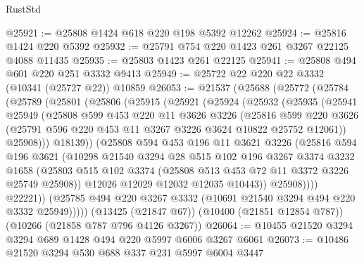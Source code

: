 \begin{lexlean}{RustStd}
\begin{coremodule}
{\begin{coremodule}
{{{{{{{{{{{{{{{{{{{{{{{{{@25921 := @25808 @1424 @618 @220 @198 @5392 @12262
@25924 := @25816 @1424 @220 @5392
@25932 := @25791 @754 @220 @1423 @261 @3267 @22125 @4088 @11435
@25935 := @25803 @1423 @261 @22125
@25941 := @25808 @494 @601 @220 @251 @3332 @9413
@25949 := @25722 @22 @220 @22 @3332 (@10341 (@25727 @22)) @10859
@26053 := @21537
    (@25688
      (@25772
        (@25784
          (@25789
            (@25801
              (@25806
                (@25915
                  (@25921
                    (@25924
                      (@25932
                        (@25935
                          (@25941
                            @25949
                            (@25808
                              @599
                              @453
                              @220
                              @11
                              @3626
                              @3226
                              (@25816
                                @599
                                @220
                                @3626
                                (@25791 @596 @220 @453 @11 @3267 @3226 @3624 @10822 @25752 @12061))
                              @25908)))
                        @18139))
                    (@25808
                      @594
                      @453
                      @196
                      @11
                      @3621
                      @3226
                      (@25816
                        @594
                        @196
                        @3621
                        (@10298
                          @21540
                          @3294
                          @28
                          @515
                          @102
                          @196
                          @3267
                          @3374
                          @3232
                          @1658
                          (@25803
                            @515
                            @102
                            @3374
                            (@25808 @513 @453 @72 @11 @3372 @3226 @25749 @25908))
                          @12026
                          @12029
                          @12032
                          @12035
                          @10443))
                      @25908))))
              @22221))
          (@25785 @494 @220 @3267 @3332 (@10691 @21540 @3294 @494 @220 @3332 @25949)))))
    (@13425 (@21847 @67))
    (@10400 (@21851 @12854 @787))
    (@10266 (@21858 @787 @796 @4126 @3267))
@26064 := @10455 @21520 @3294 @3294 @689 @1428 @494 @220 @5997 @6006 @3267 @6061
@26073 := @10486 @21520 @3294 @530 @688 @337 @231 @5997 @6004 @3447
}}}}}}}}}}}}}}}}}}}}}}}}}
\end{coremodule}}
\end{coremodule}
\end{lexlean}
